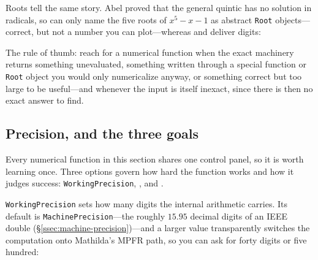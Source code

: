 Roots tell the same story. Abel proved that the general quintic has no solution in radicals, so
 can only name the five roots of \(x^5-x-1\) as abstract \texttt{Root} objects---correct,
but not a number you can plot---whereas  and  deliver digits:

\begin{codepairs}
\end{codepairs}

The rule of thumb: reach for a numerical function when the exact machinery returns something
unevaluated, something written through a special function or \texttt{Root} object you would only
numericalize anyway, or something correct but too large to be useful---and whenever the input is
itself inexact, since there is then no exact answer to find.

\subsection{Precision, and the three goals}
\label{ssec:numgoals}

Every numerical function in this section shares one control panel, so it is worth learning once.
Three options govern how hard the function works and how it judges success:
\texttt{WorkingPrecision}, , and .

\texttt{WorkingPrecision} sets how many digits the internal arithmetic carries. Its default is
\texttt{MachinePrecision}---the roughly \(15.95\) decimal digits of an IEEE double
(\S\ref{ssec:machine-precision})---and a larger value transparently switches the computation onto
Mathilda's MPFR path, so you can ask for forty digits or five hundred:

\begin{codepairs}
\end{codepairs}

